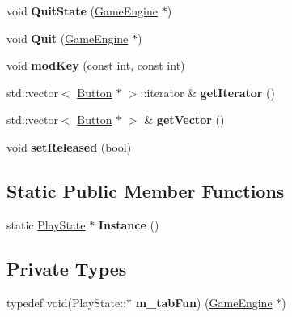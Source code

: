 \begin{DoxyCompactItemize}
\item 
\hypertarget{class_play_state_ae7a4979a48255da41c4806f4abee05ee}{}void {\bfseries Quit\+State} (\hyperlink{class_game_engine}{Game\+Engine} $\ast$)\label{class_play_state_ae7a4979a48255da41c4806f4abee05ee}

\item 
\hypertarget{class_play_state_abe2b60adecf736ed0ecbb9a928b3f0e0}{}void {\bfseries Quit} (\hyperlink{class_game_engine}{Game\+Engine} $\ast$)\label{class_play_state_abe2b60adecf736ed0ecbb9a928b3f0e0}

\item 
\hypertarget{class_play_state_a756a516b897fe84c9d02865a51170478}{}void {\bfseries mod\+Key} (const int, const int)\label{class_play_state_a756a516b897fe84c9d02865a51170478}

\item 
\hypertarget{class_play_state_af450d46bf4b5c4fc997f35410f28f3f5}{}std\+::vector$<$ \hyperlink{class_button}{Button} $\ast$ $>$\+::iterator \& {\bfseries get\+Iterator} ()\label{class_play_state_af450d46bf4b5c4fc997f35410f28f3f5}

\item 
\hypertarget{class_play_state_affeecd5e6ab6405ffdc582aa13bd5310}{}std\+::vector$<$ \hyperlink{class_button}{Button} $\ast$ $>$ \& {\bfseries get\+Vector} ()\label{class_play_state_affeecd5e6ab6405ffdc582aa13bd5310}

\item 
\hypertarget{class_play_state_a6362b722612686f9db6f0d47c8c324c4}{}void {\bfseries set\+Released} (bool)\label{class_play_state_a6362b722612686f9db6f0d47c8c324c4}

\end{DoxyCompactItemize}
\subsection*{Static Public Member Functions}
\begin{DoxyCompactItemize}
\item 
\hypertarget{class_play_state_a7f480aea6c69b654d0a50eca505b4c00}{}static \hyperlink{class_play_state}{Play\+State} $\ast$ {\bfseries Instance} ()\label{class_play_state_a7f480aea6c69b654d0a50eca505b4c00}

\end{DoxyCompactItemize}
\subsection*{Private Types}
\begin{DoxyCompactItemize}
\item 
\hypertarget{class_play_state_ab226140dffcf76fe23eab727264a4393}{}typedef void(Play\+State\+::$\ast$ {\bfseries m\+\_\+tab\+Fun}) (\hyperlink{class_game_engine}{Game\+Engine} $\ast$)\label{class_play_state_ab226140dffcf76fe23eab727264a4393}

\end{DoxyCompactItemize}
